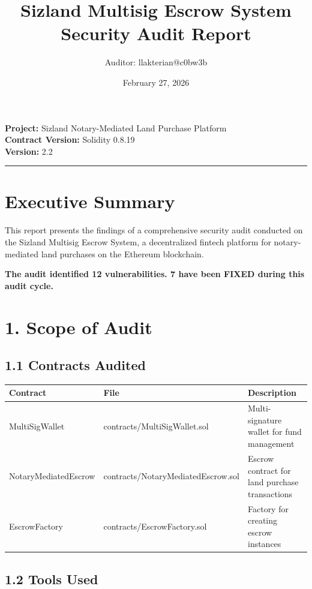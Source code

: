 \documentclass[12pt,a4paper]{article}
\title{\textbf{Sizland Multisig Escrow System} \\
\Large Security Audit Report}
\author{Auditor: llakterian@c0bw3b}
\date{February 27, 2026}
\begin{document}
\maketitle

\begin{center}
\textbf{Project:} Sizland Notary-Mediated Land Purchase Platform \\
\textbf{Contract Version:} Solidity 0.8.19 \\
\textbf{Version:} 2.2
\end{center}

\bigskip
\hrule

\section*{Executive Summary}

This report presents the findings of a comprehensive security audit conducted on the Sizland Multisig Escrow System, a decentralized fintech platform for notary-mediated land purchases on the Ethereum blockchain.

\textbf{The audit identified 12 vulnerabilities. 7 have been FIXED during this audit cycle.}

\bigskip

\section*{1. Scope of Audit}

\subsection*{1.1 Contracts Audited}

\begin{table}[h]
\centering
\begin{tabular}{llp{6cm}}
\toprule
\textbf{Contract} & \textbf{File} & \textbf{Description} \\
\midrule
MultiSigWallet & contracts/MultiSigWallet.sol & Multi-signature wallet for fund management \\
NotaryMediatedEscrow & contracts/NotaryMediatedEscrow.sol & Escrow contract for land purchase transactions \\
EscrowFactory & contracts/EscrowFactory.sol & Factory for creating escrow instances \\
\bottomrule
\end{tabular}
\end{table}

\subsection*{1.2 Tools Used}
\end{document}
